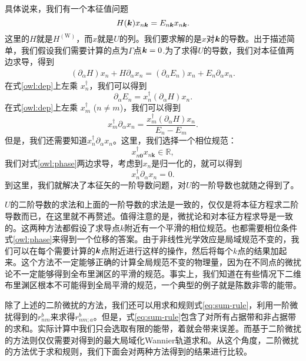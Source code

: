 具体说来，我们有一个本征值问题
\begin{equation}
H(\boldsymbol{k})x_{n\boldsymbol{k}} = E_{n\boldsymbol{k}}x_{n\boldsymbol{k}}.
\end{equation}
这里的$H$就是$H^{\mathrm{(W)}}$，而$x$就是$U$的列。我们要求解的是$x$对$\boldsymbol{k}$的导数。出于描述简单，我们假设我们需要计算的点为$\Gamma$点$\boldsymbol{k}=0$.为了求得$U$的导数，我们对本征值两边求导，得到
\begin{align}
(\partial_\alpha H) x_n+H \partial_\alpha x_n = (\partial_\alpha E_n) x_n + E_n \partial_\alpha x_n.\label{owl:dep}
\end{align}
在式\ref{owl:dep}上左乘 $x_n^\dagger$，我们可以得到
\begin{equation}
\partial_\alpha E_{n}=x_{n}^{\dagger}(\partial_\alpha H) x_{n}.
\end{equation}
在式\ref{owl:dep}上左乘 $x_m^\dagger$ ($n\ne m$)，我们可以得到
\begin{equation}
x_{m}^{\dagger}\partial_\alpha x_{n}=\frac{x_{m}^{\dagger}(\partial_\alpha H)x_{n}}{E_n-E_m}.
\end{equation}
但是，我们还需要知道$x_{n}^{\dagger}\partial_\alpha x_{n}$。这里，我们选择一个相位规范：
\begin{equation}
x_{n\boldsymbol{0}}^{\dagger} x_{n\boldsymbol{k}}\in\mathbb{R},\label{owl:phase}
\end{equation}
我们对式\ref{owl:phase}两边求导，考虑到$x_n$是归一化的，就可以得到
\begin{equation}
x_{n}^{\dagger}\partial_\alpha x_n=0.
\end{equation}
到这里，我们就解决了本征矢的一阶导数问题，对$U$的一阶导数也就随之得到了。

$U$的二阶导数的求法和上面的一阶导数的求法是一致的，仅仅是将本征方程求二阶导数而已，在这里就不再赘述。值得注意的是，微扰论和对本征方程求导是一致的。这两种方法都假设了求导点$k$附近有一个平滑的相位规范。也都需要相位条件式\ref{owl:phase}来得到一个位移的答案。由于非线性光学效应是局域规范不变的，我们可以在每个需要计算的$\boldsymbol{k}$点附近进行这样的操作，然后将每个$k$点的结果加起来。这个方法不一定能够正确的计算全局规范不变的物理量，因为在不同点的微扰论不一定能够得到全布里渊区的平滑的规范。事实上，我们知道在有些情况下二维布里渊区根本不可能得到全局平滑的规范，一个典型的例子就是陈数非零的能带\cite{b._andrei_bernevig_topological_2013}。


除了上述的二阶微扰的方法，我们还可以用求和规则式\ref{eq:sum-rule}，利用一阶微扰得到的$r_{nm}^{b}$来求得$r_{nm;a}^{b}$。但是，式\ref{eq:sum-rule}包含了对所有占据带和非占据带的求和。实际计算中我们只会选取有限的能带，着就会带来误差。而基于二阶微扰的方法则仅仅需要对得到的最大局域化Wannier轨道求和。从这个角度，二阶微扰的方法优于求和规则，我们下面会对两种方法得到的结果进行比较。


